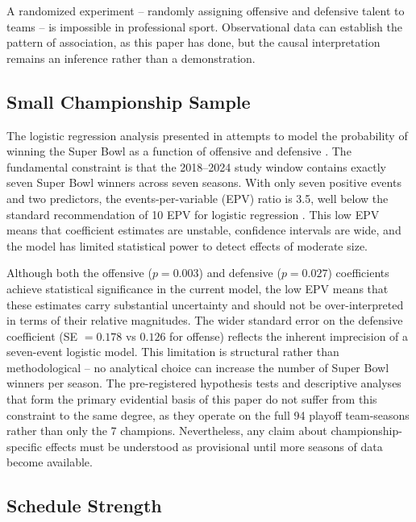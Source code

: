 A randomized experiment -- randomly assigning offensive and defensive talent to
teams -- is impossible in professional sport. Observational data can establish
the pattern of association, as this paper has done, but the causal interpretation
remains an inference rather than a demonstration.

\subsection{Small Championship Sample}
\label{sec:lim-sample}

The logistic regression analysis presented in 
attempts to model the probability of winning the Super Bowl as a function of
offensive and defensive \xvoa{}. The fundamental constraint is that the
2018--2024 study window contains exactly seven Super Bowl winners across seven
seasons. With only seven positive events and two predictors, the
events-per-variable (EPV) ratio is 3.5, well below the standard recommendation
of 10 EPV for logistic regression \parencite{peduzzi1996simulation}. This low EPV
means that coefficient estimates are unstable, confidence intervals are wide,
and the model has limited statistical power to detect effects of moderate size.

Although both the offensive ($p = 0.003$) and defensive ($p = 0.027$)
coefficients achieve statistical significance in the current model, the low EPV
means that these estimates carry substantial uncertainty and should not be
over-interpreted in terms of their relative magnitudes. The wider standard error
on the defensive coefficient (SE $= 0.178$ vs $0.126$ for offense) reflects the
inherent imprecision of a seven-event logistic model. This limitation is
structural rather than methodological -- no analytical choice can increase the
number of Super Bowl winners per season. The pre-registered hypothesis tests
and descriptive analyses that form the primary evidential basis of this paper
do not suffer from this constraint to the same degree, as they operate on the
full 94 playoff team-seasons rather than only the 7 champions. Nevertheless,
any claim about championship-specific effects must be understood as provisional
until more seasons of data become available.

\subsection{Schedule Strength}
\label{sec:lim-opponent}

